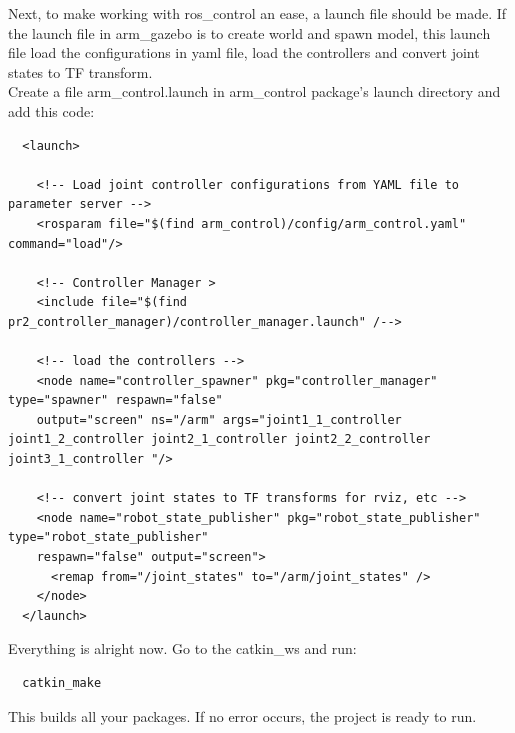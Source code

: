 \documentclass[pdftex,12pt,a4paper]{article}
\begin{document}
  \newpage
  Next, to make working with ros\_control an ease, a launch file should be made. If the launch file in arm\_gazebo is to create world and spawn model, this launch file load the configurations in yaml file, load the controllers and convert joint states to TF transform.\\
  Create a file arm\_control.launch in arm\_control package's launch directory and add this code:
  \begin{lstlisting}
  <launch>
  
    <!-- Load joint controller configurations from YAML file to parameter server -->
    <rosparam file="$(find arm_control)/config/arm_control.yaml" command="load"/>
  
    <!-- Controller Manager >
    <include file="$(find pr2_controller_manager)/controller_manager.launch" /-->
  
    <!-- load the controllers -->
    <node name="controller_spawner" pkg="controller_manager" type="spawner" respawn="false"
  	output="screen" ns="/arm" args="joint1_1_controller joint1_2_controller joint2_1_controller joint2_2_controller joint3_1_controller "/>
  
    <!-- convert joint states to TF transforms for rviz, etc -->
    <node name="robot_state_publisher" pkg="robot_state_publisher" type="robot_state_publisher"
  	respawn="false" output="screen">
      <remap from="/joint_states" to="/arm/joint_states" />
    </node>
  </launch>
  \end{lstlisting}
  Everything is alright now. Go to the catkin\_ws and run:
  \begin{lstlisting}
  catkin_make
  \end{lstlisting}
  This builds all your packages. If no error occurs, the project is ready to run.
  
  \newpage
\end{document}
